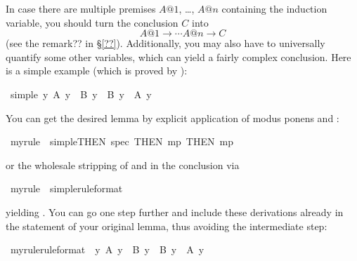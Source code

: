 \begin{isabellebody}
\begin{isamarkuptext}
In case there are multiple premises $A@1$, \dots, $A@n$ containing the
induction variable, you should turn the conclusion $C$ into
\[ A@1 \longrightarrow \cdots A@n \longrightarrow C \]
(see the remark?? in \S\ref{??}).
Additionally, you may also have to universally quantify some other variables,
which can yield a fairly complex conclusion.
Here is a simple example (which is proved by ):%
\end{isamarkuptext}%
\ simple{\isacharcolon}\ {\isachardoublequote}{\isasymforall}y{\isachardot}\ A\ y\ {\isasymlongrightarrow}\ B\ y\ {\isasymlongrightarrow}\ B\ y\ {\isacharampersand}\ A\ y{\isachardoublequote}%
\begin{isamarkuptext}%
\noindent
You can get the desired lemma by explicit
application of modus ponens and :%
\end{isamarkuptext}%
\ myrule\ {\isacharequal}\ simple{\isacharbrackleft}THEN\ spec{\isacharcomma}\ THEN\ mp{\isacharcomma}\ THEN\ mp{\isacharbrackright}%
\begin{isamarkuptext}%
\noindent
or the wholesale stripping of \isa{{\isasymforall}} and
\isa{{\isasymlongrightarrow}} in the conclusion via %
\end{isamarkuptext}%
\ myrule\ {\isacharequal}\ simple{\isacharbrackleft}rule{\isacharunderscore}format{\isacharbrackright}%
\begin{isamarkuptext}%
\noindent
yielding .
You can go one step further and include these derivations already in the
statement of your original lemma, thus avoiding the intermediate step:%
\end{isamarkuptext}%
\ myrule{\isacharbrackleft}rule{\isacharunderscore}format{\isacharbrackright}{\isacharcolon}\ \ {\isachardoublequote}{\isasymforall}y{\isachardot}\ A\ y\ {\isasymlongrightarrow}\ B\ y\ {\isasymlongrightarrow}\ B\ y\ {\isacharampersand}\ A\ y{\isachardoublequote}%
\begin{isamarkuptext}%
\bigskip


\end{isamarkuptext}
\end{isabellebody}
